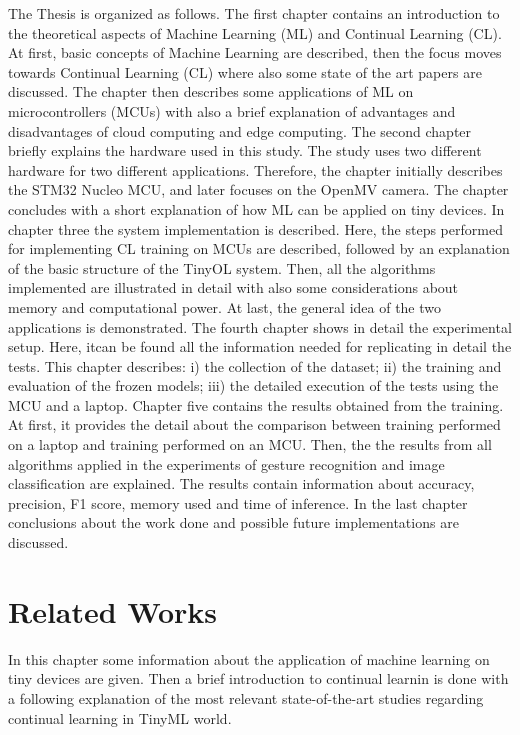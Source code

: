 \documentclass[12pt]{report}
\begin{document}
The Thesis is organized as follows. The first chapter contains an introduction to the theoretical aspects of Machine Learning (ML) and Continual Learning (CL). At first, basic concepts of Machine Learning are described, then the focus moves towards Continual Learning (CL) where also some state of the art papers are discussed. The chapter then describes some applications of ML on microcontrollers (MCUs) with also a brief explanation of advantages and disadvantages of cloud computing and edge computing. The second chapter briefly explains the hardware used in this study. The study uses two different hardware for two different applications. Therefore, the chapter initially describes the STM32 Nucleo MCU, and later focuses on the OpenMV camera. The chapter concludes with a short explanation of how ML can be applied on tiny devices. In chapter three the system implementation is described. Here, the steps performed for implementing CL training on MCUs are described, followed by an explanation of the basic structure of the TinyOL system. Then, all the algorithms implemented are illustrated in detail with also some considerations about memory and computational power. At last, the general idea of the two applications is demonstrated. The fourth chapter shows in detail the experimental setup. Here, itcan be found all the information needed for replicating in detail the tests. This chapter describes: i) the collection of the dataset; ii) the training and evaluation of the frozen models; iii) the detailed execution of the tests using the MCU and a laptop. Chapter five contains the results obtained from the training. At first, it provides the detail about the comparison between training performed on a laptop and training performed on an MCU. Then, the the results from all algorithms applied in the experiments of gesture recognition and image classification are explained. The results contain information about accuracy, precision, F1 score, memory used and time of inference. In the last chapter conclusions about the work done and possible future implementations are discussed.


\chapter{Related Works} \label{chap:relworks}
In this chapter some information about the application of machine learning on tiny devices are given. Then a brief introduction to continual learnin is done with a following explanation of the most relevant state-of-the-art studies regarding continual learning in TinyML world. 
\end{document}
